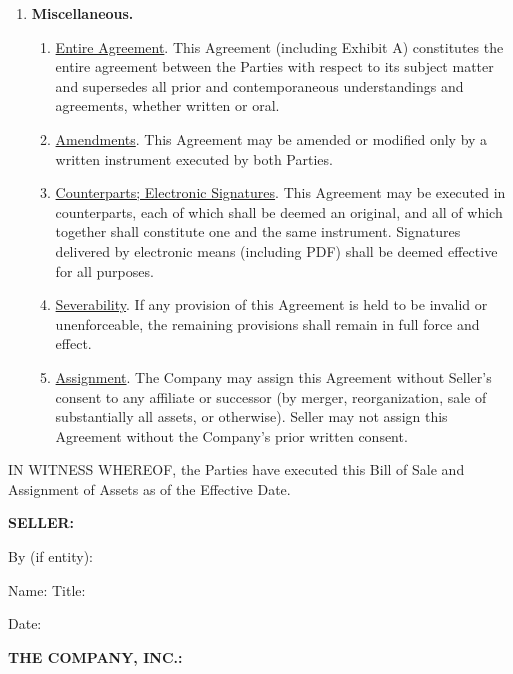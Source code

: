 \begin{enumerate}[leftmargin=*, label=\arabic*.]
	\item \textbf{Miscellaneous.}
	\begin{enumerate}[leftmargin=*, label=\arabic{enumi}.\arabic*]
		\item \uline{Entire Agreement}. This Agreement (including Exhibit A) constitutes the entire
		agreement between the Parties with respect to its subject matter and supersedes all prior
		and contemporaneous understandings and agreements, whether written or oral.

		\item \uline{Amendments}. This Agreement may be amended or modified only by a written
		instrument executed by both Parties.

		\item \uline{Counterparts; Electronic Signatures}. This Agreement may be executed in
		counterparts, each of which shall be deemed an original, and all of which together shall
		constitute one and the same instrument. Signatures delivered by electronic means (including
		PDF) shall be deemed effective for all purposes.

		\item \uline{Severability}. If any provision of this Agreement is held to be invalid or
		unenforceable, the remaining provisions shall remain in full force and effect.

		\item \uline{Assignment}. The Company may assign this Agreement without Seller's consent to
		any affiliate or successor (by merger, reorganization, sale of substantially all assets, or
		otherwise). Seller may not assign this Agreement without the Company's prior written
		consent.
	\end{enumerate}
\end{enumerate}

\bigskip
\noindent IN WITNESS WHEREOF, the Parties have executed this Bill of Sale and Assignment of
Assets as of the Effective Date.

\bigskip
\noindent \textbf{SELLER:}

\medskip
\noindent \sigline[3in]

\smallskip
\noindent By (if entity): \sellerSignByName

\smallskip
\noindent Name: \sellerSignName\qquad Title: \sellerSignTitle

\smallskip
\noindent Date: \sellerSignDate

\bigskip
\noindent \textbf{THE COMPANY, INC.:}

\medskip
\noindent \sigline[3in]

